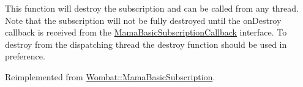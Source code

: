 This function will destroy the subscription and can be called from any thread. Note that the subscription will not be fully destroyed until the onDestroy callback is received from the \hyperlink{classWombat_1_1MamaBasicSubscriptionCallback}{MamaBasicSubscriptionCallback} interface. To destroy from the dispatching thread the destroy function should be used in preference. 

Reimplemented from \hyperlink{classWombat_1_1MamaBasicSubscription_aa00ed63c4f538d8abb21255abace5ffb}{Wombat::MamaBasicSubscription}.